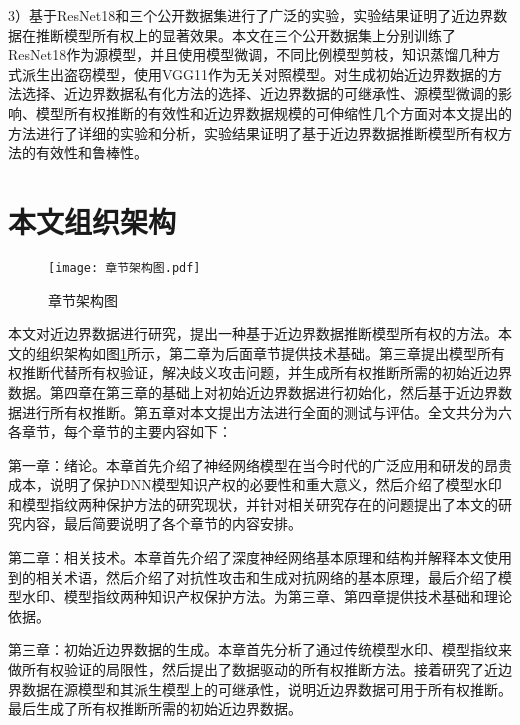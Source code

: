 3）基于ResNet18\cite{he2016deep}和三个公开数据集进行了广泛的实验，实验结果证明了近边界数据在推断模型所有权上的显著效果。本文在三个公开数据集上分别训练了ResNet18作为源模型，并且使用模型微调，不同比例模型剪枝，知识蒸馏几种方式派生出盗窃模型，使用VGG11\cite{simonyan2014very}作为无关对照模型。对生成初始近边界数据的方法选择、近边界数据私有化方法的选择、近边界数据的可继承性、源模型微调的影响、模型所有权推断的有效性和近边界数据规模的可伸缩性几个方面对本文提出的方法进行了详细的实验和分析，实验结果证明了基于近边界数据推断模型所有权方法的有效性和鲁棒性。

\section{本文组织架构}

\begin{figure}[htb]%
	\centering
		\setlength{\abovecaptionskip}{5mm} %
	\texttt{[image: 章节架构图.pdf]}
	\caption{章节架构图}
	\label{章节架构图}
	\end {figure}
	
本文对近边界数据进行研究，提出一种基于近边界数据推断模型所有权的方法。本文的组织架构如图\ref{章节架构图}所示，第二章为后面章节提供技术基础。第三章提出模型所有权推断代替所有权验证，解决歧义攻击问题，并生成所有权推断所需的初始近边界数据。第四章在第三章的基础上对初始近边界数据进行初始化，然后基于近边界数据进行所有权推断。第五章对本文提出方法进行全面的测试与评估。全文共分为六各章节，每个章节的主要内容如下：

第一章：绪论。本章首先介绍了神经网络模型在当今时代的广泛应用和研发的昂贵成本，说明了保护DNN模型知识产权的必要性和重大意义，然后介绍了模型水印和模型指纹两种保护方法的研究现状，并针对相关研究存在的问题提出了本文的研究内容，最后简要说明了各个章节的内容安排。

第二章：相关技术。本章首先介绍了深度神经网络基本原理和结构并解释本文使用到的相关术语，然后介绍了对抗性攻击和生成对抗网络的基本原理，最后介绍了模型水印、模型指纹两种知识产权保护方法。为第三章、第四章提供技术基础和理论依据。

第三章：初始近边界数据的生成。本章首先分析了通过传统模型水印、模型指纹来做所有权验证的局限性，然后提出了数据驱动的所有权推断方法。接着研究了近边界数据在源模型和其派生模型上的可继承性，说明近边界数据可用于所有权推断。最后生成了所有权推断所需的初始近边界数据。

